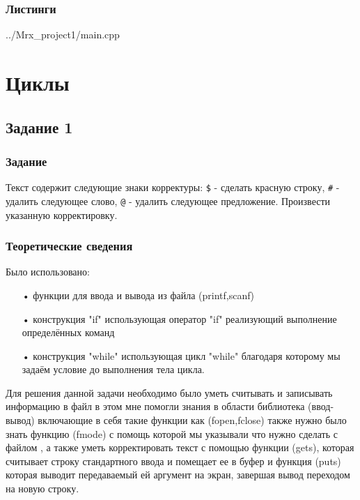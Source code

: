 \documentclass[12pt,a4paper]{report}
\begin{document}
\subsection*{Листинги}

{../Mrx_project1/main.cpp}

\chapter{Циклы}
\section{Задание 1}
\subsection{Задание}

Текст содержит следующие знаки корректуры: \verb-$- - сделать красную строку, \verb-#- - удалить следующее слово, \verb-@- - удалить следующее предложение. Произвести указанную корректировку.

\subsection{Теоретические сведения}

Было использовано:
\begin{enumerate}
\item[•] функции для ввода и вывода из файла (printf,scanf)
\item[•] конструкция "if" использующая оператор "if" реализующий выполнение определённых команд 
\item[•] конструкция "while" использующая цикл "while" благодаря которому мы задаём условие до выполнения тела цикла.
\end{enumerate}

Для решения данной задачи необходимо было уметь считывать и записывать информацию в файл в этом мне помогли знания в области библиотека (ввод-вывод) включающие в себя такие функции как (fopen,fclose) также нужно было знать функцию (fmode) с помощь которой мы указывали что нужно сделать с файлом , а также уметь корректировать текст с помощью функции (gets), которая считывает строку стандартного ввода и помещает ее в буфер и функция (puts) которая выводит передаваемый ей аргумент на экран, завершая вывод переходом на новую строку.
\end{document}

